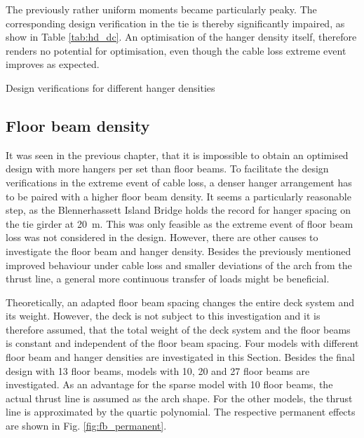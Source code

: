 The previously rather uniform moments became particularly peaky. The corresponding design verification in the tie is thereby significantly impaired, as show in Table \ref{tab:hd_dc}. An optimisation of the hanger density itself, therefore renders no potential for optimisation, even though the cable loss extreme event improves as expected.

\begin{table}[H]
    \centering
    \resizebox{\columnwidth}{!}{%
    
    }
    \caption{Design verifications for different hanger densities}
    \label{tab:hd_dc}
\end{table}


\subsection{Floor beam density}
It was seen in the previous chapter, that it is impossible to obtain an optimised design with more hangers per set than floor beams. To facilitate the design verifications in the extreme event of cable loss, a denser hanger arrangement has to be paired with a higher floor beam density. It seems a particularly reasonable step, as the Blennerhassett Island Bridge holds the record for hanger spacing on the tie girder at \SI{20}{m}. This was only feasible as the extreme event of floor beam loss was not considered in the design. However, there are other causes to investigate the floor beam and hanger density. Besides the previously mentioned improved behaviour under cable loss and smaller deviations of the arch from the thrust line, a general more continuous transfer of loads might be beneficial. \medskip

Theoretically, an adapted floor beam spacing changes the entire deck system and its weight. However, the deck is not subject to this investigation and it is therefore assumed, that the total weight of the deck system and the floor beams is constant and independent of the floor beam spacing. Four models with different floor beam and hanger densities are investigated in this Section. Besides the final design with 13 floor beams, models with 10, 20 and 27 floor beams are investigated. As an advantage for the sparse model with 10 floor beams, the actual thrust line is assumed as the arch shape. For the other models, the thrust line is approximated by the quartic polynomial. The respective permanent effects are shown in Fig. \ref{fig:fb_permanent}.

